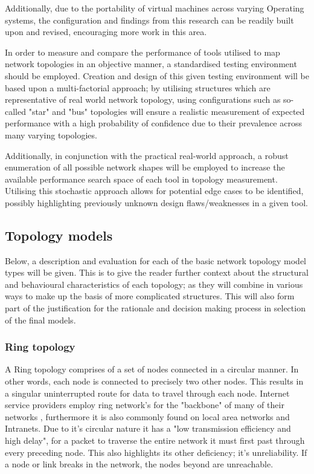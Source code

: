 Additionally, due to the portability of virtual machines across varying Operating systems, the configuration and findings from this research can be readily built upon and revised, encouraging more work in this area.

In order to measure and compare the performance of tools utilised to map network topologies in an objective manner, a standardised testing environment should be employed. Creation and design of this given testing environment will be based upon a multi-factorial approach; by utilising structures which are representative of real world network topology, using configurations such as so-called "star" and "bus" topologies will ensure a realistic measurement of expected performance with a high probability of confidence due to their prevalence across many varying topologies. 

Additionally, in conjunction with the practical real-world approach, a robust enumeration of all possible network shapes will be employed to increase the available performance search space of each tool in topology measurement. Utilising this stochastic approach allows for potential edge cases to be identified, possibly highlighting previously unknown design flaws/weaknesses in a given tool. 

\subsection{Topology models}
Below, a description and evaluation for each of the basic network topology model types will be given. This is to give the reader further context about the structural and behavioural characteristics of each topology; as they will combine in various ways to make up the basis of more complicated structures. This will also form part of the justification for the rationale and decision making process in selection of the final models.

\subsubsection{Ring topology}
A Ring topology comprises of a set of nodes connected in a circular manner. In other words, each node is connected to precisely two other nodes. This results in a singular uninterrupted route for data to travel through each node. Internet service providers employ ring network's for the "backbone" of many of their networks \cite{ring_network}, furthermore it is also commonly found on local area networks and Intranets. Due to it's circular nature it has a "low transmission efficiency and high delay", for a packet to traverse the entire network it must first past through every preceding node. This also highlights its other deficiency; it's unreliability. If a node or link breaks in the network, the nodes beyond are unreachable. \cite{ring_network}

